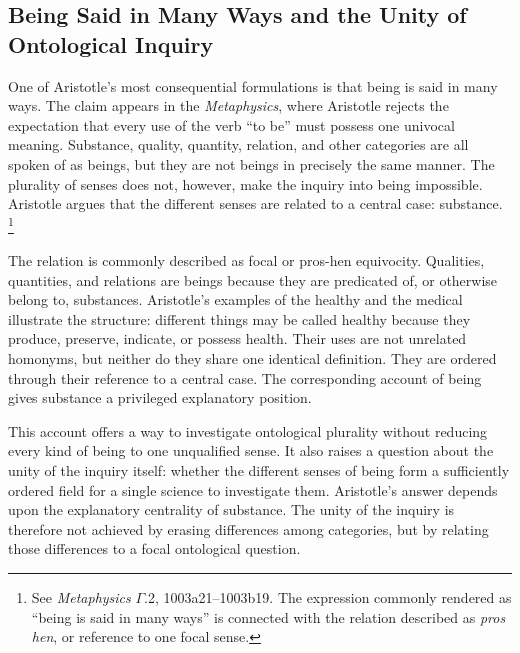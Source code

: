 \subsection{Being Said in Many Ways and the Unity of Ontological Inquiry}

\label{para:VS.B01.P01.C08.S05.SS02.P001}

One of Aristotle's most consequential formulations is that
being is said in many ways. The claim appears in the
\textit{Metaphysics}, where Aristotle rejects the expectation
that every use of the verb ``to be'' must possess one
univocal meaning. Substance, quality, quantity, relation,
and other categories are all spoken of as beings, but they
are not beings in precisely the same manner. The plurality
of senses does not, however, make the inquiry into being
impossible. Aristotle argues that the different senses are
related to a central case: substance. \footnote{See
\textit{Metaphysics} $\Gamma$.2, 1003a21--1003b19.
The expression commonly rendered as ``being is said in
many ways'' is connected with the relation described as
\textit{pros hen}, or reference to one focal sense.}

\label{para:VS.B01.P01.C08.S05.SS02.P002}

The relation is commonly described as focal or pros-hen
equivocity. Qualities, quantities, and relations are beings
because they are predicated of, or otherwise belong to,
substances. Aristotle's examples of the healthy and the
medical illustrate the structure: different things may be
called healthy because they produce, preserve, indicate,
or possess health. Their uses are not unrelated homonyms,
but neither do they share one identical definition. They
are ordered through their reference to a central case.
The corresponding account of being gives substance a
privileged explanatory position. \cite{AristotleMetaphysics,
CohenReeveAristotleMetaphysics2025}

\label{para:VS.B01.P01.C08.S05.SS02.P003}

This account offers a way to investigate ontological
plurality without reducing every kind of being to one
unqualified sense. It also raises a question about the
unity of the inquiry itself: whether the different senses
of being form a sufficiently ordered field for a single
science to investigate them. Aristotle's answer depends
upon the explanatory centrality of substance. The unity
of the inquiry is therefore not achieved by erasing
differences among categories, but by relating those
differences to a focal ontological question.

